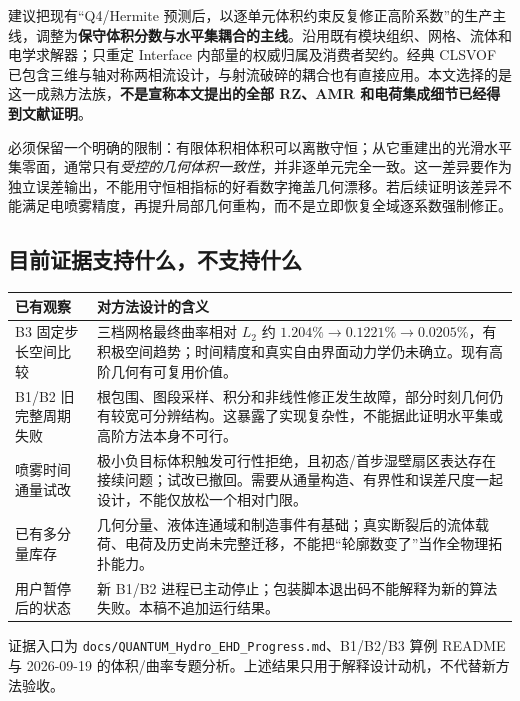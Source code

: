 \documentclass[11pt,a4paper]{article}
\newcommand{\code}[1]{{\small\nolinkurl{#1}}}
\begin{document}
建议把现有“Q4/Hermite 预测后，以逐单元体积约束反复修正高阶系数”的生产主线，调整为\textbf{保守体积分数与水平集耦合的主线}。沿用既有模块组织、网格、流体和电学求解器；只重定 Interface 内部量的权威归属及消费者契约。经典 CLSVOF 已包含三维与轴对称两相流设计\cite{sussman2000}，与射流破碎的耦合也有直接应用\cite{menard2007}。本文选择的是这一成熟方法族，\textbf{不是宣称本文提出的全部 RZ、AMR 和电荷集成细节已经得到文献证明}。

必须保留一个明确的限制：有限体积相体积可以离散守恒；从它重建出的光滑水平集零面，通常只有\emph{受控的几何体积一致性}，并非逐单元完全一致。这一差异要作为独立误差输出，不能用守恒相指标的好看数字掩盖几何漂移。若后续证明该差异不能满足电喷雾精度，再提升局部几何重构，而不是立即恢复全域逐系数强制修正。

\subsection{目前证据支持什么，不支持什么}
\begin{longtable}{L{35mm}L{114mm}}
\toprule 已有观察 & 对方法设计的含义\\\midrule\endhead
B3 固定步长空间比较 & 三档网格最终曲率相对 $L_2$ 约 $1.204\%\to0.1221\%\to0.0205\%$，有积极空间趋势；时间精度和真实自由界面动力学仍未确立。现有高阶几何有可复用价值。\\
B1/B2 旧完整周期失败 & 根包围、图段采样、积分和非线性修正发生故障，部分时刻几何仍有较宽可分辨结构。这暴露了实现复杂性，不能据此证明水平集或高阶方法本身不可行。\\
喷雾时间通量试改 & 极小负目标体积触发可行性拒绝，且初态/首步湿壁扇区表达存在接续问题；试改已撤回。需要从通量构造、有界性和误差尺度一起设计，不能仅放松一个相对门限。\\
已有多分量库存 & 几何分量、液体连通域和制造事件有基础；真实断裂后的流体载荷、电荷及历史尚未完整迁移，不能把“轮廓数变了”当作全物理拓扑能力。\\
用户暂停后的状态 & 新 B1/B2 进程已主动停止；包装脚本退出码不能解释为新的算法失败。本稿不追加运行结果。\\\bottomrule
\end{longtable}
证据入口为 \code{docs/QUANTUM_Hydro_EHD_Progress.md}、B1/B2/B3 算例 README 与 2026-09-19 的体积/曲率专题分析。上述结果只用于解释设计动机，不代替新方法验收。
\end{document}
